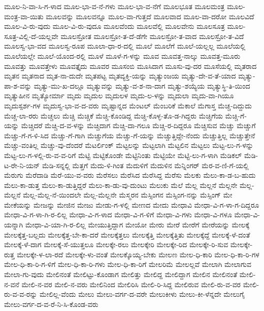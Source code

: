 {ಮೂಲ-ನಿ-ವಾ-ಸಿ-ಗ-ಳಾದ
ಮೂಲ-ಭಾ-ವ-ನೆ-ಗಳು
ಮೂಲ-ಭಾ-ವ-ನೆಗೆ
ಮೂಲಭೂತ
ಮೂಲಮಂತ್ರ
ಮೂಲ-ಮಂತ್ರ-ವಾ-ಯಿತು
ಮೂಲವನ್ನು
ಮೂಲವನ್ನೂ
ಮೂಲ-ವಾ-ಗುತ್ತದೆ
ಮೂಲವಾದ
ಮೂಲ-ವಾ-ದರೋ
ಮೂಲವಿದೆ
ಮೂಲ-ವಿ-ರು-ವುದು
ಮೂಲ-ವಿ-ರು-ವುದೂ
ಮೂಲವೆಂದು
ಮೂಲವೆಲ್ಲಿ
ಮೂಲವೇನು
ಮೂಲಸೂತ್ರ
ಮೂಲ-ಸೂತ್ರ-ವಿಲ್ಲಿ-ದೆ-ಯಲ್ಲವೇ
ಮೂಲಸ್ರೋತ
ಮೂಲಸ್ರೋ-ತ-ದೆ-ಡೆಗೇ
ಮೂಲಸ್ರೋ-ತ-ವಾದ
ಮೂಲಸ್ರೋ-ತ-ವಿದೆ
ಮೂಲಸ್ವ-ಭಾ-ವದ
ಮೂಲಸ್ವ-ರೂಪ
ಮೂಲಾ-ಧಾ-ರ-ದಲ್ಲಿ
ಮೂಲೆ
ಮೂಲೆಗೆ
ಮೂಲೆ-ಯಲ್ಲಲ್ಲ
ಮೂಲೆಯಲ್ಲಿ
ಮೂಲೆಯಲ್ಲೇ
ಮೂಲೆ-ಯೊಂದ-ರಲ್ಲಿ
ಮೂಳೆ
ಮೂಳೆ-ಗ-ಳನ್ನು
ಮೂವ
ಮೂವತ್ತ-ನಾಲ್ಕು
ಮೂವತ್ತ-ಮೂರು
ಮೂವತ್ತು
ಮೂವತ್ತೇಳು
ಮೂವತ್ತೈದು
ಮೂವರ
ಮೂಸಂಬಿ
ಮೂಸಿದಾಗ
ಮೂಸು-ವು-ದರ
ಮೂಸೆಯಲ್ಲಿ
ಮೃತರಾದ
ಮೃತನ
ಮೃತನಾದ
ಮೃತ-ನಾ-ದುದೇ
ಮೃತಪಟ್ಟ
ಮೃತವ್ಯಕ್ತಿ-ಯನ್ನು
ಮೃತ್ಯುಂಜಯ
ಮೃತ್ಯು-ದೇ-ವ-ತೆ-ಯಾದ
ಮೃತ್ಯು-ಪಾ-ಶ-ವನ್ನು
ಮೃತ್ಯು-ಮು-ಖ-ದಲ್ಲೂ
ಮೃತ್ಯುವನ್ನು
ಮೃತ್ಯು-ವ-ಶ-ನಾ-ದಾಗ
ಮೃತ್ಯು-ಶಯ್ಯೆಯ
ಮೃತ್ಯುಸ್ಥಿ-ತಿ-ಯಿಂದ
ಮೃತ್ಯುಹೀನ
ಮೃತ್ಯೋರ್ಮಾ
ಮೃದು
ಮೃದುಲ
ಮೃದುಲಳ
ಮೃದು-ಲ-ಳನ್ನು
ಮೃದುಲಾ
ಮೃದು-ವಾ-ಗಿಯೂ
ಮೃದುಸ್ಪರ್ಶ-ಗಳ
ಮೃದುಸ್ವ-ಭಾ-ವ-ದ-ವರು
ಮೃಷ್ಟಾನ್ನದ
ಮೆಂಟಲ್
ಮೆಂಬರಿಕೆ
ಮೆಕಾಲೆ
ಮೆಗಾಸ್ತ
ಮೆಚ್ಚ-ದಿದ್ದುದು
ಮೆಚ್ಚ-ಲಾ-ರರು
ಮೆಚ್ಚಲು
ಮೆಚ್ಚಿ
ಮೆಚ್ಚಿಕೆ
ಮೆಚ್ಚಿ-ಕೊಂಡಿದ್ದ
ಮೆಚ್ಚಿ-ಕೊಳ್ಳ-ತೊ-ಡ-ಗಿದ್ದರು
ಮೆಚ್ಚಿಗೆಯ
ಮೆಚ್ಚಿ-ಗೆ-ಯನ್ನು
ಮೆಚ್ಚಿದರೆ
ಮೆಚ್ಚಿ-ದ-ವ-ಳನ್ನು
ಮೆಚ್ಚಿದಾಗ
ಮೆಚ್ಚಿ-ದಾ-ಗಲೂ
ಮೆಚ್ಚಿ-ರ-ದಿದ್ದರೂ
ಮೆಚ್ಚಿಸುವ
ಮೆಚ್ಚು
ಮೆಚ್ಚುಗೆ
ಮೆಚ್ಚು-ಗೆ-ಗ-ಳಿ-ಸಿದ
ಮೆಚ್ಚು-ಗೆ-ಗಾಗಿ
ಮೆಚ್ಚುಗೆಯ
ಮೆಚ್ಚು-ಗೆ-ಯನ್ನು
ಮೆಚ್ಚುತ್ತಿದ್ದೇ-ನೆಂದು
ಮೆಚ್ಚುತ್ತಿಲ್ಲ
ಮೆಚ್ಚುತ್ತೇನೆ
ಮೆಚ್ಚು-ವಂತಿಲ್ಲ
ಮೆಚ್ಚು-ವು-ದೆಂದರೆ
ಮೆಟರ್ಲಿಂಕ್
ಮೆಟ್ಟಲನ್ನು
ಮೆಟ್ಟಲಾಗಿ
ಮೆಟ್ಟಲಿನ
ಮೆಟ್ಟಲು
ಮೆಟ್ಟ-ಲು-ಗ-ಳನ್ನು
ಮೆಟ್ಟ-ಲು-ಗ-ಳಲ್ಲಿ-ರು-ವ-ವ-ರಿಗೆ
ಮೆಟ್ಟಿ
ಮೆಟ್ಟಿಕೊಂಡೇ
ಮೆಟ್ಟಿನಿಂತು
ಮೆಟ್ಟಿಯೇ
ಮೆಟ್ಟಿ-ಲು-ಗ-ಳಾಗಿ
ಮೆಡಿಕಲ್
ಮೆಡಿ-ಟ-ರೇ-ನಿ-ಯನ್
ಮೆಡಿ-ಸನ್ನಲ್ಲಿ
ಮೆತ್ತಗೆ
ಮೆದು-ಳಿ-ಗಿಂತ
ಮೆದುಳಿಗೆ
ಮೆದುಳಿನ
ಮೆನ್ನಿಂಗರ್
ಮೆರ-ವ-ಣಿ-ಗೆ-ಯಲ್ಲಿ
ಮೆರುಗು
ಮೆರೆದಾಡಿ
ಮೆರೆ-ಯು-ವ-ವರು
ಮೆರೆಸಲು
ಮೆರೆಸಿದ
ಮೆರೆಸಿದ್ದ
ಮೆರೆಸು
ಮೆಲಕು
ಮೆಲು-ಕಾ-ಡ-ಬ-ಹುದು
ಮೆಲು-ಕಾ-ಡುತ್ತ
ಮೆಲು-ಕಾ-ಡುತ್ತಿದ್ದರೆ
ಮೆಲು-ಕಾ-ಡು-ವು-ದುಂಟು
ಮೆಲುಕು
ಮೆಲೆ
ಮೆಲ್ಲ
ಮೆಲ್ಲನೆ
ಮೆಲ್ಲನೇ
ಮೆಲ್ಲ-ಮೆಲ್ಲನೆ
ಮೆಲ್ಲ-ಮೆಲ್ಲ-ನೆ-ಯಿಂದಲೇ
ಮೆಲ್ಲ-ಮೆಲ್ಲನೇ
ಮೆಸ್ಮರನ
ಮೆಸ್ಸಿಂಗನ
ಮೆಸ್ಸಿಂಗ-ನನ್ನು
ಮೆಸ್ಸಿಂಗ್
ಮೇ
ಮೇಕೆಯನ್ನು
ಮೇಜನ್ನು
ಮೇಜಿನ
ಮೇಜು
ಮೇಡು-ಗ-ಳಲ್ಲಿ
ಮೇಣದ
ಮೇದು
ಮೇಧಾವಿ
ಮೇಧಾ-ವಿ-ಗ-ಳಾ-ಗ-ದಿದ್ದರೂ
ಮೇಧಾ-ವಿ-ಗ-ಳಾ-ಗಿ-ರ-ಲಿಲ್ಲ
ಮೇಧಾ-ವಿ-ಗ-ಳಾದ
ಮೇಧಾ-ವಿ-ಗ-ಳಿಗೆ
ಮೇಧಾ-ವಿ-ಗಳು
ಮೇಧಾ-ವಿ-ಗಳೂ
ಮೇಧಾ-ವಿ-ಯನ್ನಾಗಿ
ಮೇಧಾ-ವಿ-ಯಾ-ಗಿ-ರ-ಲಿಲ್ಲ
ಮೇಯುತ್ತಿದ್ದಾಗ
ಮೇಯೋ
ಮೇರು
ಮೇರೆ
ಮೇರೆಗೆ
ಮೇರೆಯನ್ನು
ಮೇಲಕ್ಕೆ
ಮೇಲಕ್ಕೆತ್ತ-ಬಲ್ಲದು
ಮೇಲಕ್ಕೆತ್ತ-ಬೇ-ಕಾ-ದರೆ
ಮೇಲಕ್ಕೆತ್ತಲು
ಮೇಲಕ್ಕೆತ್ತಿ
ಮೇಲಕ್ಕೆತ್ತಿತು
ಮೇಲಕ್ಕೆದ್ದೆ
ಮೇಲಕ್ಕೆ-ಳೆ-ದಂತೆ
ಮೇಲಕ್ಕೆ-ಳೆ-ದಾಗ
ಮೇಲಕ್ಕೆ-ಸೆ-ಯುತ್ತಲೂ
ಮೇಲಕ್ಕೇ-ರಲು
ಮೇಲಕ್ಕೇರಿ
ಮೇಲಕ್ಕೇ-ರಿದ
ಮೇಲಕ್ಕೇ-ರಿ-ಸುವ
ಮೇಲಕ್ಕೇ-ರುತ್ತ
ಮೇಲಕ್ಕೇ-ಳ-ಲಾ-ರದೆ
ಮೇಲಕ್ಕೇ-ಳು-ವಂತೆ
ಮೇಲಕ್ಕೊಯ್ಯ-ಬೇಕು
ಮೇಲಣ
ಮೇಲ-ಧಿ-ಕಾರಿ
ಮೇಲ-ಧಿ-ಕಾ-ರಿ-ಗಳ
ಮೇಲ-ಧಿ-ಕಾ-ರಿ-ಗ-ಳಿಗೆ
ಮೇಲ-ಧಿ-ಕಾ-ರಿ-ಗಳು
ಮೇಲ-ಧಿ-ಕಾ-ರಿಗೆ
ಮೇಲರಿಮೆ
ಮೇಲಲ್ಲವೆ
ಮೇಲಾಗಿ
ಮೇಲಾಗುವ
ಮೇಲಾ-ಗು-ವುದು
ಮೇಲಿನಂತೆ
ಮೇಲಿಟ್ಟು-ಕೊಂಡಾಗ
ಮೇಲಿತ್ತು
ಮೇಲಿದ್ದ
ಮೇಲಿದ್ದಾಗ
ಮೇಲಿನ
ಮೇಲಿನಂತೆ
ಮೇಲಿ-ನ-ವನೆ
ಮೇಲಿ-ನ-ವರ
ಮೇಲಿ-ನ-ವರು
ಮೇಲಿನಿಂದ
ಮೇಲಿರಿಸಿ
ಮೇಲಿ-ರಿ-ಸಿದ್ದ
ಮೇಲಿರುವ
ಮೇಲಿ-ರು-ವ-ವರ
ಮೇಲಿ-ರು-ವ-ವ-ರನ್ನು
ಮೇಲಿಲ್ಲ-ವೆಂದು
ಮೇಲು
ಮೇಲು-ವರ್ಗ-ದ-ವರೇ
ಮೇಲುಕೀಳು
ಮೇಲು-ಕೀ-ಳೆನ್ನದೇ
ಮೇಲುಗೈ
ಮೇಲು-ವರ್ಗ-ದ-ವ-ರೆ-ನಿ-ಸಿ-ಕೊಂಡ-ವರು
}
